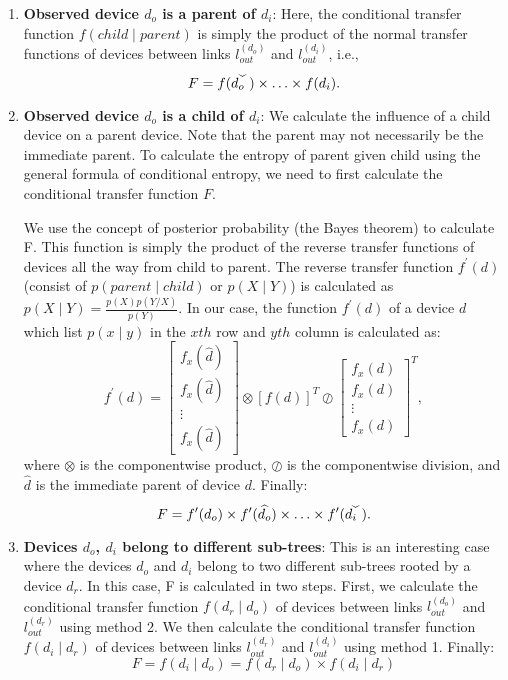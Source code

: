 \begin{enumerate}
\item \textbf{Observed device $d_o$ is a parent of $d_i$}:
Here, the conditional transfer function $f(child \mid parent)$ is simply the product of the normal transfer functions of devices between links $l_{out}^{(d_o)}$ and $l_{out}^{(d_i)}$, i.e.,
\[F = f(\widecheck {d_o}) \times \hdots \times f(d_i).\]

\item \textbf{Observed device $d_o$ is a child of $d_i$}:
We calculate the influence of a child device on a parent device. Note that the parent may not necessarily be the immediate parent. To calculate the entropy of parent given child using the general formula of conditional entropy, we need to first calculate the conditional transfer function $F$.

We use the concept of posterior probability (the Bayes theorem) to calculate F. This function is simply the product of the reverse transfer functions of devices all the way from child to parent. The reverse transfer function $f^\prime(d)$ (consist of $p(parent \mid child)$ or $p(X \mid Y)$) is calculated as $p(X \mid Y) = \frac{p(X) p(Y/X)}{ p(Y)}$.  In our case, the function $f^\prime(d)$ of a device $d$ which list $p(x \mid y)$ in the $xth$ row and $yth$ column is calculated as:
\[f^\prime(d) = \left[\begin{array}{c} f_x(\widehat d)\\ f_x(\widehat d)\\ \vdots\\ f_x(\widehat d) \end{array}\right] \otimes \left[f(d)\right]^T \oslash \left[\begin{array}{c} f_x(d)\\ f_x(d)\\ \vdots\\ f_x(d) \end{array}\right]^T,\]
\noindent where $\otimes$ is the componentwise product, $\oslash$ is the componentwise division, and $\widehat d$ is the immediate parent of device $d$.
Finally:
\vspace{-0.1in}\[F = f^\prime(d_o) \times f^\prime(\widehat {d_o}) \times \hdots \times f^\prime(\widecheck {d_i}).\]

\vspace{-0.1in}
\item \textbf{Devices $d_o$, $d_i$ belong to different sub-trees}:
This is an interesting case where the devices $d_o$ and $d_i$ belong to two different sub-trees rooted by a device $d_r$. In this case, F is calculated in two steps. First, we calculate the conditional transfer function $f(d_r \mid d_o)$ of devices between links $l_{out}^{(d_o)}$ and $l_{out}^{(d_r)}$ using method 2. We then calculate the conditional transfer function $f(d_i \mid d_r)$ of devices between links $l_{out}^{(d_r)}$ and $l_{out}^{(d_i)}$ using method 1. Finally: 
\vspace{-0.1in}\[F = f(d_i \mid d_o) = f(d_r \mid d_o) \times f(d_i \mid d_r)\]
\end{enumerate}


